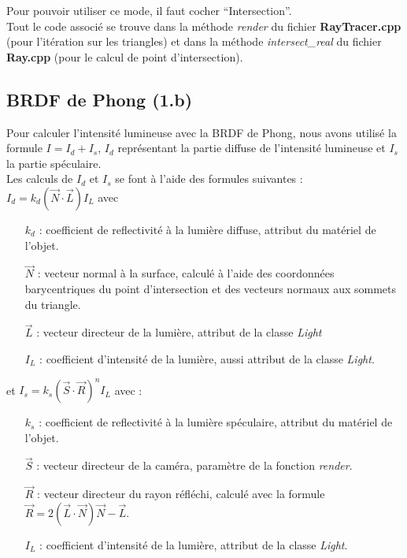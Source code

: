 \documentclass[a4paper,11pt,titlepage]{article}
\begin{document}
Pour pouvoir utiliser ce mode, il faut cocher ``Intersection''.\\

Tout le code associé se trouve dans la méthode \textit{render} du fichier \textbf{RayTracer.cpp} (pour l'itération sur les triangles) et dans la méthode \textit{intersect\_real} du fichier \textbf{Ray.cpp} (pour le calcul de point d'intersection).

\subsection{BRDF de Phong (1.b)}

Pour calculer l'intensité lumineuse avec la BRDF de Phong, nous avons utilisé la formule $I = I_d + I_s$, $I_d$ représentant la partie diffuse de l'intensité lumineuse et $I_s$ la partie spéculaire. \\

Les calculs de $I_d$ et $I_s$ se font à l'aide des formules suivantes : \\
$I_d = k_d(\vec N \cdot \vec L)I_L$ avec 
\begin{itemize}
 \item[$k_d$ :] coefficient de reflectivité à la lumière diffuse, attribut du matériel de l'objet.
 \item[$\vec N$ :] vecteur normal à la surface, calculé à l'aide des coordonnées barycentriques du point d'intersection et des vecteurs normaux aux sommets du triangle.
 \item[$\vec L$ :] vecteur directeur de la lumière, attribut de la classe \textit{Light}
 \item[$I_L$ :] coefficient d'intensité de la lumière, aussi attribut de la classe \textit{Light}.\\
\end{itemize}
et $I_s = k_s(\vec S \cdot \vec R)^nI_L$ avec : 
\begin{itemize}
 \item[$k_s$ :] coefficient de reflectivité à la lumière spéculaire, attribut du matériel de l'objet.
 \item[$\vec S$ :] vecteur directeur de la caméra, paramètre de la fonction \textit{render}.
 \item[$\vec R$ :] vecteur directeur du rayon réfléchi, calculé avec la formule\\ $\vec R = 2(\vec L \cdot \vec N)\vec N - \vec L$.
 \item[$I_L$ :] coefficient d'intensité de la lumière, attribut de la classe \textit{Light}.\\
\end{itemize}
\end{document}
